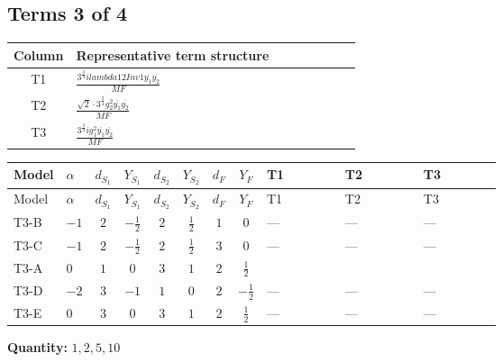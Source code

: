 \documentclass[8pt]{article}
\begin{document}
\begin{landscape}
\subsection*{Terms 3 of 4}
\begin{center}
\begin{tabular}{@{}c >{\raggedright\arraybackslash}p{0.82\linewidth}@{}}
\toprule
Column & Representative term structure \\
\midrule
T1 & \(\displaystyle \frac{3^{\frac{3}{4}} i lambda12Inv1 \overline{y_{1}} \overline{y_{2}}}{MF}\) \\
\midrule
T2 & \(\displaystyle \frac{\sqrt{2} \cdot 3^{\frac{3}{4}} g_{2}^{2} \overline{y_{1}} \overline{y_{2}}}{MF}\) \\
\midrule
T3 & \(\displaystyle \frac{3^{\frac{3}{4}} i g_{1}^{2} \overline{y_{1}} \overline{y_{2}}}{MF}\) \\
\midrule
\bottomrule
\end{tabular}
\end{center}
\smallskip
\tiny
\begin{longtable}{@{}llcccccc >{\raggedright\arraybackslash}p{0.21\linewidth} >{\raggedright\arraybackslash}p{0.21\linewidth} >{\raggedright\arraybackslash}p{0.21\linewidth}@{}}
\toprule
Model & $\alpha$ & $d_{S_1}$ & $Y_{S_1}$ & $d_{S_2}$ & $Y_{S_2}$ & $d_F$ & $Y_F$ & T1 & T2 & T3 \\
\midrule
\endfirsthead
\toprule
Model & $\alpha$ & $d_{S_1}$ & $Y_{S_1}$ & $d_{S_2}$ & $Y_{S_2}$ & $d_F$ & $Y_F$ & T1 & T2 & T3 \\
\midrule
\endhead
T3-B & $-1$ & $2$ & $-\frac{1}{2}$ & $2$ & $\frac{1}{2}$ & $1$ & $0$ & --- & --- & --- \\
\midrule
T3-C & $-1$ & $2$ & $-\frac{1}{2}$ & $2$ & $\frac{1}{2}$ & $3$ & $0$ & --- & --- & --- \\
\midrule
T3-A & $0$ & $1$ & $0$ & $3$ & $1$ & $2$ & $\frac{1}{2}$ & \scriptsize\adjustbox{max width=\linewidth}{$\begin{gathered} \frac{3^{\frac{3}{4}} i lambda12Inv1 \overline{y_{1}} \overline{y_{2}}}{6 MF}\end{gathered}$} & \scriptsize\adjustbox{max width=\linewidth}{$\begin{gathered} \frac{\sqrt{2} \cdot 3^{\frac{3}{4}} g_{2}^{2} \overline{y_{1}} \overline{y_{2}}}{6 MF}\end{gathered}$} & \scriptsize\adjustbox{max width=\linewidth}{$\begin{gathered} \frac{3^{\frac{3}{4}} i g_{1}^{2} \overline{y_{1}} \overline{y_{2}}}{8 MF}\end{gathered}$} \\
\midrule
T3-D & $-2$ & $3$ & $-1$ & $1$ & $0$ & $2$ & $-\frac{1}{2}$ & --- & --- & --- \\
\midrule
T3-E & $0$ & $3$ & $0$ & $3$ & $1$ & $2$ & $\frac{1}{2}$ & --- & --- & --- \\
\midrule
\bottomrule
\end{longtable}
\clearpage
\noindent\textbf{Quantity: }$\mathrm{1,2,5,10}$\par\smallskip

\end{landscape}
\end{document}

